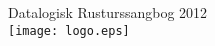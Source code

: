 \pagestyle{empty}
\begin{center}
  {\LARGE Datalogisk Rusturssangbog 2012}\\
  \texttt{[image: logo.eps]}
\end{center}

\newpage
{}